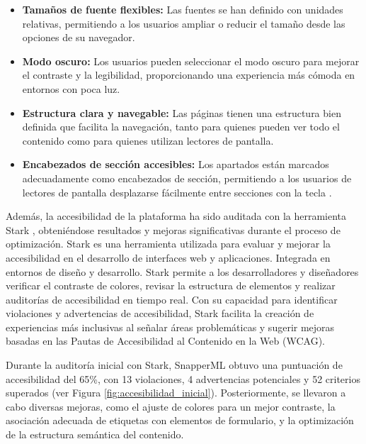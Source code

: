 \begin{itemize}
    \item \textbf{Tamaños de fuente flexibles:} Las fuentes se han definido con unidades relativas, permitiendo a los usuarios ampliar o reducir el tamaño desde las opciones de su navegador.
    \item \textbf{Modo oscuro:} Los usuarios pueden seleccionar el modo oscuro para mejorar el contraste y la legibilidad, proporcionando una experiencia más cómoda en entornos con poca luz.
    \item \textbf{Estructura clara y navegable:} Las páginas tienen una estructura bien definida que facilita la navegación, tanto para quienes pueden ver todo el contenido como para quienes utilizan lectores de pantalla.
    \item \textbf{Encabezados de sección accesibles:} Los apartados están marcados adecuadamente como encabezados de sección, permitiendo a los usuarios de lectores de pantalla desplazarse fácilmente entre secciones con la tecla .
\end{itemize}

Además, la accesibilidad de la plataforma ha sido auditada con la herramienta Stark \cite{stark}, obteniéndose resultados y mejoras significativas durante el proceso de optimización. Stark es una herramienta utilizada para evaluar y mejorar la accesibilidad en el desarrollo de interfaces web y aplicaciones. Integrada en entornos de diseño y desarrollo. Stark permite a los desarrolladores y diseñadores verificar el contraste de colores, revisar la estructura de elementos y realizar auditorías de accesibilidad en tiempo real. Con su capacidad para identificar violaciones y advertencias de accesibilidad, Stark facilita la creación de experiencias más inclusivas al señalar áreas problemáticas y sugerir mejoras basadas en las Pautas de Accesibilidad al Contenido en la Web (WCAG).

\vspace{4mm}

Durante la auditoría inicial con Stark, SnapperML obtuvo una puntuación de accesibilidad del 65\%, con 13 violaciones, 4 advertencias potenciales y 52 criterios superados (ver Figura \ref{fig:accesibilidad_inicial}). Posteriormente, se llevaron a cabo diversas mejoras, como el ajuste de colores para un mejor contraste, la asociación adecuada de etiquetas con elementos de formulario, y la optimización de la estructura semántica del contenido.

\vspace{4mm}

